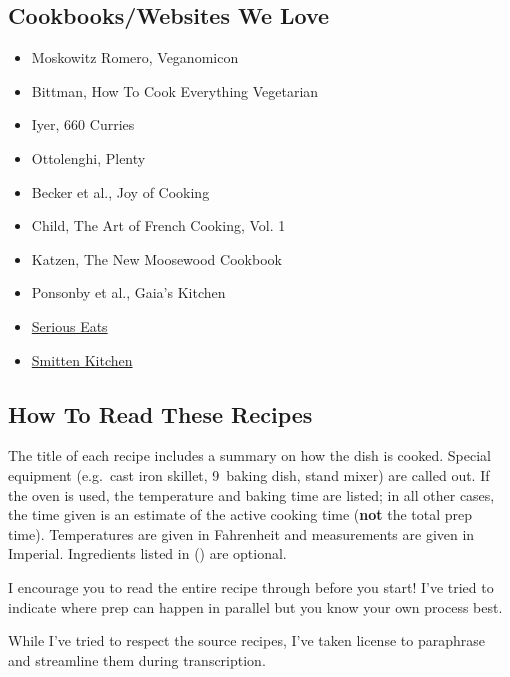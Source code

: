 \subsection{Cookbooks/Websites We Love}
\begin{itemize}
  \item Moskowitz \And Romero, Veganomicon
 \item Bittman, How To Cook Everything Vegetarian
 \item Iyer, 660 Curries
 \item Ottolenghi, Plenty
 \item Becker et al., Joy of Cooking
 \item Child, The Art of French Cooking, Vol. 1
 \item Katzen, The New Moosewood Cookbook
 \item Ponsonby et al., Gaia’s Kitchen
 \item \href{https://www.seriouseats.com/}{Serious Eats}
 \item \href{https://smittenkitchen.com/}{Smitten Kitchen}
\end{itemize}

\subsection{How To Read These Recipes}
The title of each recipe includes a summary on how the dish is cooked. Special equipment (e.g.\ cast iron skillet, 9\inch{}\inch\ baking dish, stand mixer) are called out. If the oven is used, the temperature and baking time are listed; in all other cases, the time given is an estimate of the active cooking time (\textbf{not} the total prep time). Temperatures are given in Fahrenheit and measurements are given in Imperial. Ingredients listed in () are optional.

I encourage you to read the entire recipe through before you start! I've tried to indicate where prep can happen in parallel but you know your own process best.

While I've tried to respect the source recipes, I've taken license to paraphrase and streamline them during transcription.
